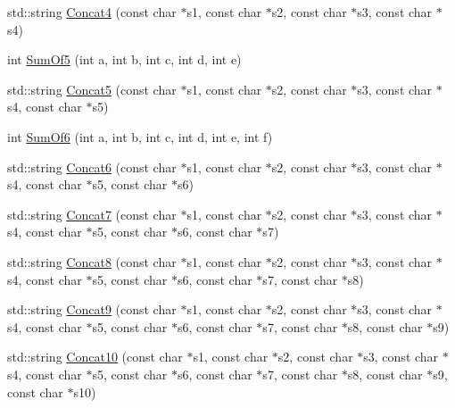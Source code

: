 \begin{DoxyCompactItemize}
\item 
std\+::string \mbox{\hyperlink{namespacetesting_1_1gmock__generated__actions__test_aab6acb97e71142752555bec85fa80d28}{Concat4}} (const char $\ast$s1, const char $\ast$s2, const char $\ast$s3, const char $\ast$s4)
\item 
int \mbox{\hyperlink{namespacetesting_1_1gmock__generated__actions__test_a7ebfbfdf11d92d4f99df6b659c371e74}{Sum\+Of5}} (int a, int b, int c, int d, int e)
\item 
std\+::string \mbox{\hyperlink{namespacetesting_1_1gmock__generated__actions__test_a5eb28d383a654ddc97e16496753c9e45}{Concat5}} (const char $\ast$s1, const char $\ast$s2, const char $\ast$s3, const char $\ast$s4, const char $\ast$s5)
\item 
int \mbox{\hyperlink{namespacetesting_1_1gmock__generated__actions__test_a3f60acee43510c1603549a1f3bab61ad}{Sum\+Of6}} (int a, int b, int c, int d, int e, int f)
\item 
std\+::string \mbox{\hyperlink{namespacetesting_1_1gmock__generated__actions__test_a396ec2823c0f57354328548dadb56502}{Concat6}} (const char $\ast$s1, const char $\ast$s2, const char $\ast$s3, const char $\ast$s4, const char $\ast$s5, const char $\ast$s6)
\item 
std\+::string \mbox{\hyperlink{namespacetesting_1_1gmock__generated__actions__test_aab764d169a360cb5d3cbcd75dd15aa4a}{Concat7}} (const char $\ast$s1, const char $\ast$s2, const char $\ast$s3, const char $\ast$s4, const char $\ast$s5, const char $\ast$s6, const char $\ast$s7)
\item 
std\+::string \mbox{\hyperlink{namespacetesting_1_1gmock__generated__actions__test_a1f2f8cb9de8d3cc3affccab4e33a78e6}{Concat8}} (const char $\ast$s1, const char $\ast$s2, const char $\ast$s3, const char $\ast$s4, const char $\ast$s5, const char $\ast$s6, const char $\ast$s7, const char $\ast$s8)
\item 
std\+::string \mbox{\hyperlink{namespacetesting_1_1gmock__generated__actions__test_a923b7a16f0ea702fad1c8b2f9be8902d}{Concat9}} (const char $\ast$s1, const char $\ast$s2, const char $\ast$s3, const char $\ast$s4, const char $\ast$s5, const char $\ast$s6, const char $\ast$s7, const char $\ast$s8, const char $\ast$s9)
\item 
std\+::string \mbox{\hyperlink{namespacetesting_1_1gmock__generated__actions__test_aa3e21c9555fb8d1eafd7186d1e9b2db3}{Concat10}} (const char $\ast$s1, const char $\ast$s2, const char $\ast$s3, const char $\ast$s4, const char $\ast$s5, const char $\ast$s6, const char $\ast$s7, const char $\ast$s8, const char $\ast$s9, const char $\ast$s10)

\end{DoxyCompactItemize}
